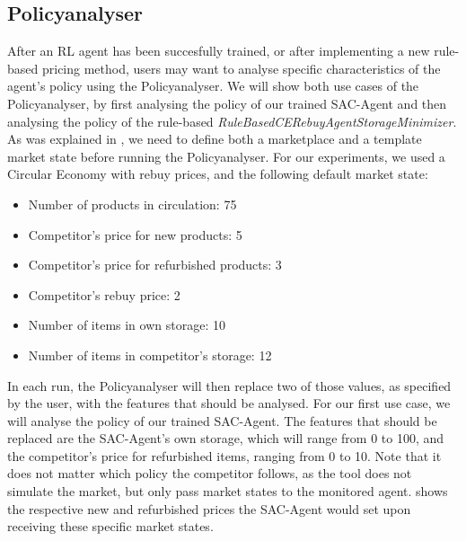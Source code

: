 \subsection{Policyanalyser}\label{subsec:ResultsPolicyanalyser}

After an RL agent has been succesfully trained, or after implementing a new rule-based pricing method, users may want to analyse specific characteristics of the agent's policy using the Policyanalyser. We will show both use cases of the Policyanalyser, by first analysing the policy of our trained SAC-Agent and then analysing the policy of the rule-based \emph{RuleBasedCERebuyAgentStorageMinimizer}. As was explained in , we need to define both a marketplace and a template market state before running the Policyanalyser. For our experiments, we used a Circular Economy with rebuy prices, and the following default market state:

\begin{itemize}
	\setlength\itemsep{0em}
	\item Number of products in circulation: 75
	\item Competitor's price for new products: 5
	\item Competitor's price for refurbished products: 3
	\item Competitor's rebuy price: 2
	\item Number of items in own storage: 10
	\item Number of items in competitor's storage: 12
\end{itemize}
In each run, the Policyanalyser will then replace two of those values, as specified by the user, with the features that should be analysed. For our first use case, we will analyse the policy of our trained SAC-Agent. The features that should be replaced are the SAC-Agent's own storage, which will range from 0 to 100, and the competitor's price for refurbished items, ranging from 0 to 10. Note that it does not matter which policy the competitor follows, as the tool does not simulate the market, but only pass market states to the monitored agent.  shows the respective new and refurbished prices the SAC-Agent would set upon receiving these specific market states.

